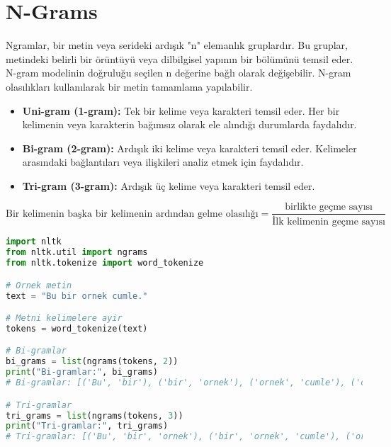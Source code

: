 \section{N-Grams}
Ngramlar, bir metin veya serideki ardışık "n" elemanlık gruplardır. Bu gruplar, metindeki belirli bir örüntüyü veya dilbilgisel yapının bir bölümünü temsil eder. N-gram modelinin doğruluğu seçilen n değerine bağlı olarak değişebilir. N-gram olasılıkları kullanılarak bir metin tamamlama yapılabilir. 
\begin{itemize}
    \item \textbf{Uni-gram (1-gram):} Tek bir kelime veya karakteri temsil eder. Her bir kelimenin veya karakterin bağımsız olarak ele alındığı durumlarda faydalıdır.
    \item \textbf{Bi-gram (2-gram):} Ardışık iki kelime veya karakteri temsil eder. Kelimeler arasındaki bağlantıları veya ilişkileri analiz etmek için faydalıdır.
    \item \textbf{Tri-gram (3-gram):} Ardışık üç kelime veya karakteri temsil eder.
\end{itemize}

\[\text{Bir kelimenin başka bir kelimenin ardından gelme olasılığı} = \frac{\text{birlikte geçme sayısı}}{\text{İlk kelimenin geçme sayısı}}\]

\begin{lstlisting}[language=Python]
import nltk
from nltk.util import ngrams
from nltk.tokenize import word_tokenize

# Ornek metin
text = "Bu bir ornek cumle."

# Metni kelimelere ayir
tokens = word_tokenize(text)

# Bi-gramlar
bi_grams = list(ngrams(tokens, 2))
print("Bi-gramlar:", bi_grams)
# Bi-gramlar: [('Bu', 'bir'), ('bir', 'ornek'), ('ornek', 'cumle'), ('cumle', '.')]

# Tri-gramlar
tri_grams = list(ngrams(tokens, 3))
print("Tri-gramlar:", tri_grams)
# Tri-gramlar: [('Bu', 'bir', 'ornek'), ('bir', 'ornek', 'cumle'), ('ornek', 'cumle', '.')]
\end{lstlisting}

\newpage